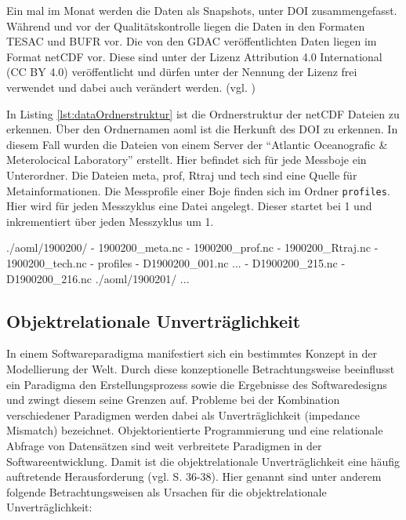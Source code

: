     Ein mal im Monat werden die Daten als Snapshots, unter \gls{DOI} zusammengefasst.
    Während und vor der Qualitätskontrolle liegen die Daten in den Formaten \gls{TESAC} und \gls{BUFR} vor.
    Die von den \gls{GDAC} veröffentlichten Daten liegen im Format \gls{netCDF} vor. Diese sind unter der Lizenz Attribution 4.0 International (CC BY 4.0) veröffentlicht und dürfen unter der Nennung der Lizenz frei verwendet und dabei auch verändert werden. (vgl. \cite{ArgoDataDocumentation})



In Listing \ref{lst:dataOrdnerstruktur} ist die Ordnerstruktur der \gls{netCDF} Dateien zu erkennen. Über den Ordnernamen aoml ist die Herkunft des \gls{DOI} zu erkennen. In diesem Fall wurden die Dateien von einem Server der  "`Atlantic Oceanografic \& Meterolocical Laboratory"' erstellt. Hier befindet sich für jede Messboje ein Unterordner.  Die Dateien meta, prof, Rtraj und tech sind eine Quelle für Metainformationen. Die Messprofile einer Boje finden sich im Ordner \texttt{profiles}. Hier wird für jeden Messzyklus eine Datei angelegt. Dieser startet bei 1 und inkrementiert über jeden Messzyklus um 1.

    \begin{python}[label={lst:dataOrdnerstruktur}, caption={Die Verzeichnisstruktur der vom aoml bereitgestellten Daten}]
./aoml/1900200/
- 1900200_meta.nc
- 1900200_prof.nc
- 1900200_Rtraj.nc
- 1900200_tech.nc
- profiles
    - D1900200_001.nc
    ...
    - D1900200_215.nc
    - D1900200_216.nc
./aoml/1900201/
...\end{python}


\subsection{Objektrelationale Unverträglichkeit}

In einem Softwareparadigma manifestiert sich ein bestimmtes Konzept in der Modellierung der Welt. Durch diese konzeptionelle Betrachtungsweise beeinflusst ein Paradigma den Erstellungsprozess sowie die Ergebnisse des Softwaredesigns und zwingt diesem seine Grenzen auf. Probleme bei der Kombination verschiedener Paradigmen werden dabei als Unverträglichkeit (impedance Mismatch) bezeichnet.
Objektorientierte Programmierung  und eine relationale Abfrage von Datensätzen sind weit verbreitete Paradigmen in der Softwareentwicklung. Damit ist die objektrelationale Unverträglichkeit eine häufig auftretende Herausforderung (vgl. \cite{ireland2009classification} S. 36-38).
Hier genannt sind unter anderem folgende Betrachtungsweisen als Ursachen für die objektrelationale Unverträglichkeit:

